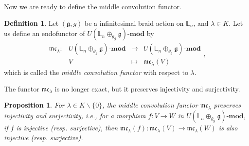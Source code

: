 \documentclass[a4paper,12pt]{article}
\newtheorem{prop}[thm]{Proposition}
\theoremstyle{definition}
\newtheorem{df}[thm]{Definition}
\theoremstyle{remark}
\begin{document}
Now we are ready to define the middle convolution functor.
\begin{df}\label{df:midconv}
Let $(\mathfrak{g},g)$ be a infinitesimal braid action 
on $\mathbb{L}_{n}$, and $\lambda\in K$.
Let us define an endofunctor of $U(\mathbb{L}_{n}\oplus_{\theta_{g}}\mathfrak{g})$-$\mathbf{mod}$
by 
\[
	\begin{array}{cccc}
		\mathfrak{mc}_{\lambda}\colon &
		U(\mathbb{L}_{n}\oplus_{\theta_{g}}\mathfrak{g})\text{-}\mathbf{mod}
		&\longrightarrow &U(\mathbb{L}_{n}\oplus_{\theta_{g}}\mathfrak{g})\text{-}\mathbf{mod}\\
		&V&\longmapsto&
		\mathfrak{mc}_{\lambda}(V)
	\end{array},
\]
which is called the \emph{middle convolution functor} with respect to $\lambda$.
\end{df}
The functor $\mathfrak{mc}_{\lambda}$ is no longer exact, but it preserves injectivity and surjectivity.
\begin{prop}
For $\lambda\in K\backslash\{0\}$, 
the middle convolution functor $\mathfrak{mc}_{\lambda}$ preserves injectivity and surjectivity, i.e., 
for a morphism $f\colon V\to W$ in $U(\mathbb{L}_{n}\oplus_{\theta_{g}}\mathfrak{g})\text{-}\mathbf{mod}$, if $f$ is injective (resp. surjective), 
then $\mathfrak{mc}_{\lambda}(f)\colon \mathfrak{mc}_{\lambda}(V)\to \mathfrak{mc}_{\lambda}(W)$ is also injective (resp. surjective).
\end{prop}
\end{document}
